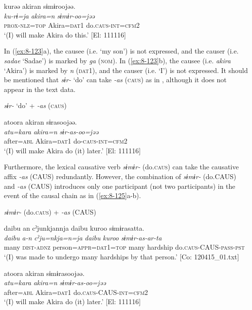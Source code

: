 \ex
{\TM}
\glll  kurəə  akiran  sɨmɨroojəə.\\
\textit{ku-rɨ=ja}  \textit{akira=n}  \textit{sɨmɨr-oo=jəə}\\
\textsc{prox}-\textsc{nlz}=\textsc{top}  Akira=\textsc{dat1}  do.\textsc{caus}-\textsc{int}=\textsc{cfm2}\\
\glt ‘(I) will make Akira do this.’ [El: 111116]
\z
\z

In (\ref{ex:8-123}a), the causee (i.e. ‘my son’) is not expressed, and the causer (i.e. \textit{sadae} ‘Sadae’) is marked by \textit{ga} (\textsc{nom}). In (\ref{ex:8-123}b), the causee (i.e. \textit{akira} ‘Akira’) is marked by \textit{n} (\textsc{dat1}), and the causer (i.e. ‘I’) is not expressed. It should be mentioned that \textit{sɨr-} ‘do’ can take \textit{-as} (\textsc{caus}) as in , although it does not appear in the text data.

\ea\label{ex:8-124}
  \textit{sɨr-} ‘do’ + \textit{-as} (\textsc{caus})

  {\TM}
\glll  atoora  akiran  sɨrasoojəə.\\
\textit{atu=kara}  \textit{akira=n}  \textit{sɨr-as-oo=jəə}\\
    after=\textsc{abl}  Akira=\textsc{dat1}  do-\textsc{caus}-\textsc{int}=\textsc{cfm2}\\
\glt ‘(I) will make Akira do (it) later.’ [El: 111116]
\z

Furthermore, the lexical causative verb \textit{sɨmɨr-} (do.\textsc{caus}) can take the causative affix \textit{-as} (CAUS) redundantly. However, the combination of \textit{sɨmɨr-} (do.CAUS) and \textit{-as} (CAUS) introduces only one participant (not two participants) in the event of the causal chain as in (\ref{ex:8-125}a-b).

\ea\label{ex:8-125}
  \textit{sɨmɨr-} (do.\textsc{caus}) + \textit{-as} (CAUS)

\ea
{\TM}
\glll  {\textbar}daibu{\textbar}  an  cˀjunkjannja  {\textbar}daibu  kuroo{\textbar}      sɨmɨrasatta.\\
\textit{daibu}  \textit{a-n}  \textit{cˀju=nkja=n=ja}  \textit{daibu}  \textit{kuroo}     \textit{sɨmɨr-as-ar-ta}\\
many  \textsc{dist}-\textsc{adnz}  person=\textsc{appr}=\textsc{dat1}=\textsc{top}  many  hardship  do.\textsc{caus}-CAUS-\textsc{pass}-\textsc{pst}\\
\glt ‘(I) was made to undergo many hardships by that person.’ [Co: 120415\_01.txt]

\ex
{\TM}
\glll  atoora  akiran  sɨmɨrasoojəə.\\
\textit{atu=kara}  \textit{akira=n}  \textit{sɨmɨr-as-oo=jəə}\\
after=\textsc{abl}  Akira=\textsc{dat1}  do.\textsc{caus}-CAUS-\textsc{int}=\textsc{cfm2}\\
\glt ‘(I) will make Akira do (it) later.’ [El: 111116]
\z
\z


